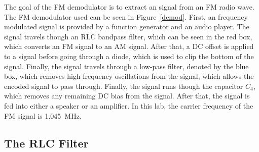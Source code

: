 \documentclass[11pt,letterpaper]{article}
\begin{document}
The goal of the FM demodulator is to extract an signal from an FM radio wave.
The FM demodulator used can be seen in Figure~\ref{demod}. First, an frequency
modulated signal is provided by a function generator and an audio player. The
signal travels though an RLC bandpass filter, which can be seen in the red box,
which converts an FM signal to an AM signal. After that, a DC offset is applied
to a signal before going through a diode, which is used to clip the bottom of
the signal. Finally, the signal travels through a low-pass filter, denoted by
the blue box, which removes high frequency oscillations from the signal, which
allows the encoded signal to pass through. Finally, the signal runs though the
capacitor $C_4$, which removes any remaining DC bias from the signal. After
that, the signal is fed into either a speaker or an amplifier. In this lab, the
carrier frequency of the FM signal is \SI{1.045}{\mega\hertz}.

\subsection{The RLC Filter}
\end{document}

